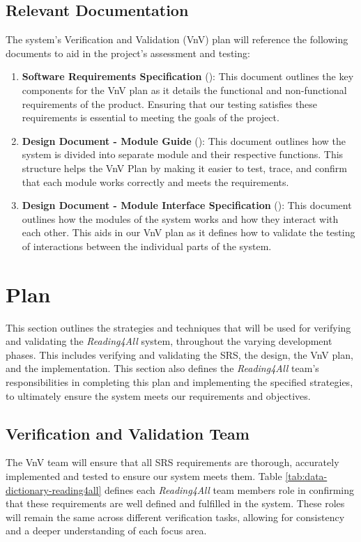 \documentclass[12pt, titlepage]{article}
\begin{document}
\subsection{Relevant Documentation}
The system's Verification and Validation (VnV) plan will reference the
following documents to aid in
the project's assessment and testing:
\begin{enumerate}
  \item \textbf{Software Requirements Specification} (\citet{SRS}):
    This document outlines the key components
    for the VnV plan as it details the functional and non-functional
    requirements of the product. Ensuring that our testing
    satisfies these requirements is essential to meeting the goals of
    the project.
  \item \textbf{Design Document - Module Guide} (\citet{MG}): This
    document outlines how the system is divided into separate module
    and their respective functions.
    This structure helps the VnV Plan by making it easier to test,
    trace, and confirm that each module works correctly and meets the
    requirements.
  \item \textbf{Design Document - Module Interface Specification}
    (\citet{MIS}): This document outlines how the modules of the
    system works and how they interact with each other.
    This aids in our VnV plan as it defines how to validate the
    testing of interactions between the individual parts of the system.
\end{enumerate}

\section{Plan}

This section outlines the strategies and techniques that will be used for verifying and validating the \textit{Reading4All} system, throughout the varying development phases. 
This includes verifying and validating the SRS, the design, the VnV plan, and the implementation. This section also defines the \textit{Reading4All} team's responsibilities in 
completing this plan and implementing the specified strategies, to ultimately ensure the system meets our requirements and objectives.

\subsection{Verification and Validation Team}

The VnV team will ensure that all SRS requirements are thorough, accurately implemented and tested to ensure our system meets them. 
Table \ref{tab:data-dictionary-reading4all} defines each \textit{Reading4All} team members role in confirming that these requirements are well defined and fulfilled in the system.
These roles will remain the same across different verification tasks, allowing for consistency and a deeper understanding of each focus area. 
\end{document}
